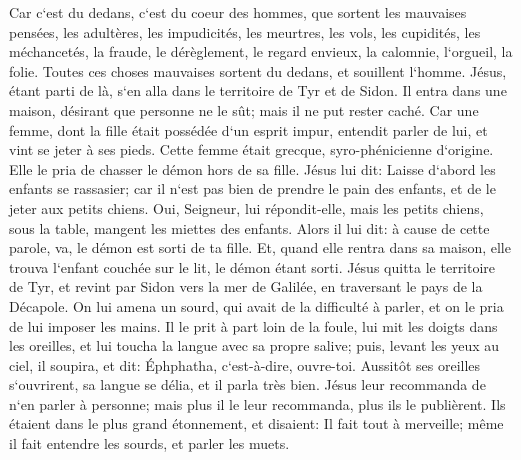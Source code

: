 \verse Car c`est du dedans, c`est du coeur des hommes, que sortent les mauvaises pensées, les adultères, les impudicités, les meurtres, 
\verse les vols, les cupidités, les méchancetés, la fraude, le dérèglement, le regard envieux, la calomnie, l`orgueil, la folie. 
\verse Toutes ces choses mauvaises sortent du dedans, et souillent l`homme. 
\verse Jésus, étant parti de là, s`en alla dans le territoire de Tyr et de Sidon. Il entra dans une maison, désirant que personne ne le sût; mais il ne put rester caché. 
\verse Car une femme, dont la fille était possédée d`un esprit impur, entendit parler de lui, et vint se jeter à ses pieds. 
\verse Cette femme était grecque, syro-phénicienne d`origine. Elle le pria de chasser le démon hors de sa fille. Jésus lui dit: 
\verse Laisse d`abord les enfants se rassasier; car il n`est pas bien de prendre le pain des enfants, et de le jeter aux petits chiens. 
\verse Oui, Seigneur, lui répondit-elle, mais les petits chiens, sous la table, mangent les miettes des enfants. 
\verse Alors il lui dit: à cause de cette parole, va, le démon est sorti de ta fille. 
\verse Et, quand elle rentra dans sa maison, elle trouva l`enfant couchée sur le lit, le démon étant sorti. 
\verse Jésus quitta le territoire de Tyr, et revint par Sidon vers la mer de Galilée, en traversant le pays de la Décapole. 
\verse On lui amena un sourd, qui avait de la difficulté à parler, et on le pria de lui imposer les mains. 
\verse Il le prit à part loin de la foule, lui mit les doigts dans les oreilles, et lui toucha la langue avec sa propre salive; 
\verse puis, levant les yeux au ciel, il soupira, et dit: Éphphatha, c`est-à-dire, ouvre-toi. 
\verse Aussitôt ses oreilles s`ouvrirent, sa langue se délia, et il parla très bien. 
\verse Jésus leur recommanda de n`en parler à personne; mais plus il le leur recommanda, plus ils le publièrent. 
\verse Ils étaient dans le plus grand étonnement, et disaient: Il fait tout à merveille; même il fait entendre les sourds, et parler les muets. 

